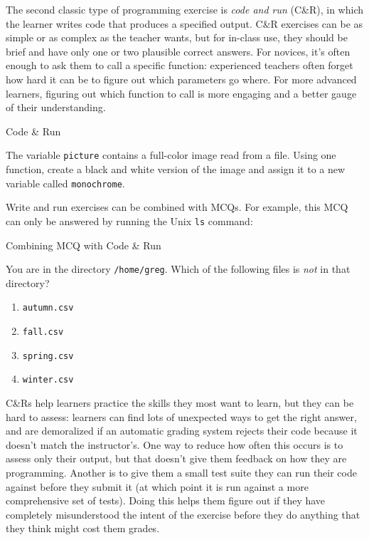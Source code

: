 The second classic type of programming exercise is \emph{code and run}
(C\&R), in which the learner writes code that produces a specified
output. C\&R exercises can be as simple or as complex as the teacher
wants, but for in-class use, they should be brief and have only one or
two plausible correct answers. For novices, it's often enough to ask
them to call a specific function: experienced teachers often forget how
hard it can be to figure out which parameters go where. For more
advanced learners, figuring out which function to call is more engaging
and a better gauge of their understanding.

\begin{aside}{Code \& Run}

The variable \texttt{picture} contains a full-color image read from a file.
Using one function, create a black and white version of the image and
assign it to a new variable called \texttt{monochrome}.

\end{aside}

Write and run exercises can be combined with MCQs. For example, this MCQ
can only be answered by running the Unix \texttt{ls} command:

\begin{aside}{Combining MCQ with Code \& Run}

You are in the directory \texttt{/home/greg}. Which of the following files is
\emph{not} in that directory?

\begin{enumerate}
\item
  \texttt{autumn.csv}
\item
  \texttt{fall.csv}
\item
  \texttt{spring.csv}
\item
  \texttt{winter.csv}
\end{enumerate}

\end{aside}

C\&Rs help learners practice the skills they most want to learn, but
they can be hard to assess: learners can find lots of unexpected ways to
get the right answer, and are demoralized if an automatic grading system
rejects their code because it doesn't match the instructor's. One way to
reduce how often this occurs is to assess only their output, but that
doesn't give them feedback on how they are programming. Another is to
give them a small test suite they can run their code against before they
submit it (at which point it is run against a more comprehensive set of
tests). Doing this helps them figure out if they have completely
misunderstood the intent of the exercise before they do anything that
they think might cost them grades.

